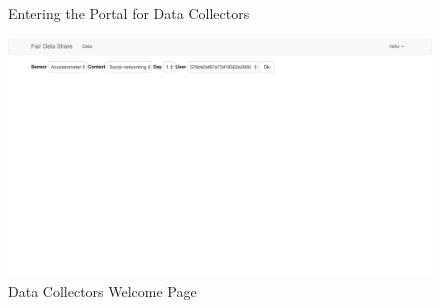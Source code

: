 \begin{figure}[htp]
  \hspace{1em}
  \caption{Entering the Portal for Data Collectors}
  \label{fig:fds4}
\end{figure}

\begin{figure}[ht!]
\centering
\includegraphics[width=\textwidth,keepaspectratio]{./images/fds_dc_welcome}
\caption{Data Collectors Welcome Page \label{fig:fds5}}
\end{figure}






